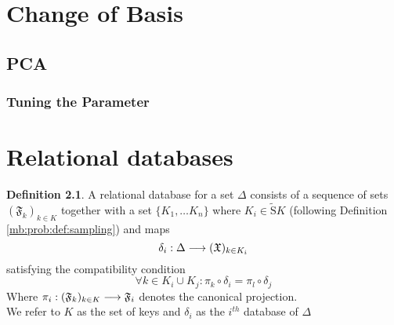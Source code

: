 \documentclass{book}
\theoremstyle{plain}
\theoremstyle{definition}
\newtheorem{definition}[corollary]{Definition}
\newcommand{\draw}[1]{\widetilde{\textrm{S}} #1}
\newcommand{\f}[1]{\mathfrak{#1}}
\newcommand{\mor}{\longrightarrow}
\begin{document}
\chapter{Change of Basis}

\section{PCA}

\subsection{Tuning the Parameter}


\chapter{Relational databases}

\begin{definition}
A relational database for  a set $\Delta$ consists of a sequence of sets $(\f{F}_k)_{k \in K}$ together with a set $\{K_1,\ldots K_n\}$ where $K_i \in \draw{K}$ (following Definition \ref{mb:prob:def:sampling}) and maps
\[
\delta_i: \Delta \mor (\frak{X})_{k \in K_i}
\]
satisfying the compatibility condition
\[
\forall k \in K_i\cup K_j: \pi_k\circ \delta_i = \pi_l\circ \delta_j
\]
Where $\pi_i: (\frak{F}_k)_{k \in K}\mor \frak{F}_i$ denotes the canonical projection.\\
We refer to $K$ as the set of keys and $\delta_i$ as the $i^{th}$ database of $\Delta$
\end{definition}



\end{document}
